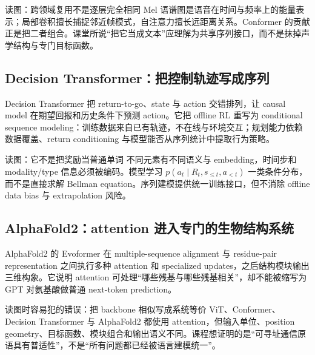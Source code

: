 \begin{knowledgebox}{读图：跨领域复用不是逐层完全相同}
Mel 语谱图是语音在时间与频率上的能量表示；局部卷积擅长捕捉邻近帧模式，自注意力擅长远距离关系。Conformer 的贡献正是把二者组合。课堂所说“把它当成文本”应理解为共享序列接口，而不是抹掉声学结构与专门目标函数。
\end{knowledgebox}

\subsection{Decision Transformer：把控制轨迹写成序列}

Decision Transformer 把 return-to-go、state 与 action 交错排列，让 causal model 在期望回报和历史条件下预测 action。它把 offline RL 重写为 conditional sequence modeling：训练数据来自已有轨迹，不在线与环境交互；规划能力依赖数据覆盖、return conditioning 与模型能否从序列统计中提取行为策略。


\begin{knowledgebox}{读图：它不是把奖励当普通单词}
不同元素有不同语义与 embedding，时间步和 modality/type 信息必须被编码。模型学习 $p(a_t\mid R_t,s_{\le t},a_{<t})$ 一类条件分布，而不是直接求解 Bellman equation。序列建模提供统一训练接口，但不消除 offline data bias 与 extrapolation 风险。
\end{knowledgebox}

\subsection{AlphaFold2：attention 进入专门的生物结构系统}

AlphaFold2 的 Evoformer 在 multiple-sequence alignment 与 residue-pair representation 之间执行多种 attention 和 specialized updates，之后结构模块输出三维构象。它说明 attention 可处理“哪些残基与哪些残基相关”，却不能被缩写为 GPT 对氨基酸做普通 next-token prediction。


\begin{warningbox}{读图时容易犯的错误：把 backbone 相似写成系统等价}
ViT、Conformer、Decision Transformer 与 AlphaFold2 都使用 attention，但输入单位、position geometry、目标函数、模块组合和输出语义不同。课程想证明的是“可寻址通信原语具有普适性”，不是“所有问题都已经被语言建模统一”。
\end{warningbox}


